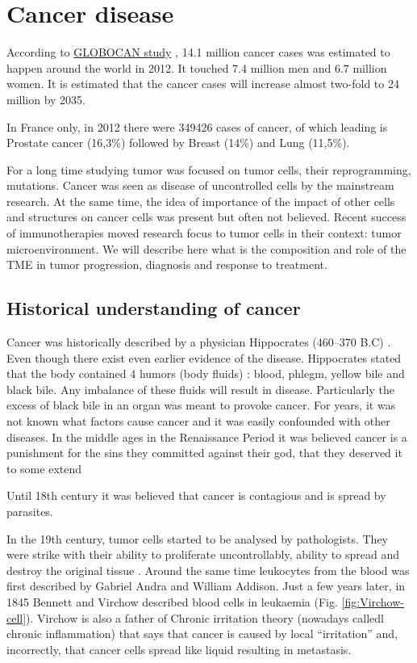 \documentclass[12pt,]{book}
\theoremstyle{definition}
\theoremstyle{definition}
\theoremstyle{definition}
\theoremstyle{remark}
\begin{document}
\hypertarget{cancer-disease}{%
\section{Cancer disease}\label{cancer-disease}}

According to
\href{http://globocan.iarc.fr/Pages/fact_sheets_cancer.aspx}{GLOBOCAN
study} \citep{GLOBOCAN}, 14.1 million cancer cases was estimated to
happen around the world in 2012. It touched 7.4 million men and 6.7
million women. It is estimated that the cancer cases will increase
almost two-fold to 24 million by 2035.

In France only, in 2012 there were 349426 cases of cancer, of which
leading is Prostate cancer (16,3\%) followed by Breast (14\%) and Lung
(11,5\%).

For a long time studying tumor was focused on tumor cells, their
reprogramming, mutations. Cancer was seen as disease of uncontrolled
cells by the mainstream research. At the same time, the idea of
importance of the impact of other cells and structures on cancer cells
was present but often not believed. Recent success of immunotherapies
moved research focus to tumor cells in their context: tumor
microenvironment. We will describe here what is the composition and role
of the TME in tumor progression, diagnosis and response to treatment.

\hypertarget{hist}{%
\subsection{Historical understanding of cancer}\label{hist}}

Cancer was historically described by a physician Hippocrates (460--370
B.C) \citep{Sudhakar2009}. Even though there exist even earlier evidence
of the disease. Hippocrates stated that the body contained 4 humors
(body fluids) : blood, phlegm, yellow bile and black bile. Any imbalance
of these fluids will result in disease. Particularly the excess of black
bile in an organ was meant to provoke cancer. For years, it was not
known what factors cause cancer and it was easily confounded with other
diseases. In the middle ages in the Renaissance Period it was believed
cancer is a punishment for the sins they committed against their god,
that they deserved it to some extend

Until 18th century it was believed that cancer is contagious and is
spread by parasites.

In the 19th century, tumor cells started to be analysed by pathologists.
They were strike with their ability to proliferate uncontrollably,
ability to spread and destroy the original tissue \citep{NPR2010}.
Around the same time leukocytes from the blood was first described by
Gabriel Andra and William Addison. Just a few years later, in 1845
Bennett and Virchow described blood cells in leukaemia (Fig.
\ref{fig:Virchow-cell}). Virchow is also a father of Chronic irritation
theory (nowadays calledl chronic inflammation) that says that cancer is
caused by local ``irritation'' and, incorrectly, that cancer cells
spread like liquid resulting in metastasis.
\end{document}
